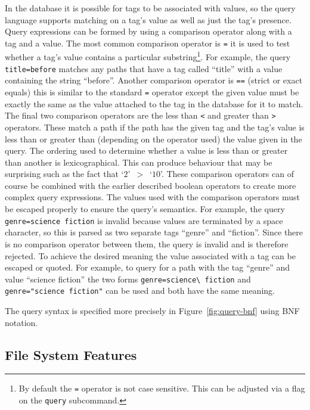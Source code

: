 In the database it is possible for tags to be associated with values, so the
query language supports matching on a tag's value as well as just the tag's
presence. Query expressions can be formed by using a comparison operator along
with a tag and a value. The most common comparison operator is \texttt{=} it is
used to test whether a tag's value contains a particular substring\footnote{By
default the \texttt{=} operator is not case sensitive. This can be adjusted via
a flag on the \texttt{query} subcommand.}. For example, the query
\texttt{title=before} matches any paths that have a tag called ``title'' with a
value containing the string ``before''. Another comparison operator is
\texttt{==} (strict or exact equals) this is similar to the standard \texttt{=}
operator except the given value must be exactly the same as the value attached
to the tag in the database for it to match. The final two comparison operators
are the less than \texttt{<} and greater than \texttt{>} operators. These match
a path if the path has the given tag and the tag's value is less than or
greater than (depending on the operator used) the value given in the query. The
ordering used to determine whether a value is less than or greater than another
is lexicographical. This can produce behaviour that may be surprising such as
the fact that `$2$'~$>$~`$10$'. These comparison operators can of course be
combined with the earlier described boolean operators to create more complex
query expressions. The values used with the comparison operators must be
escaped properly to ensure the query's semantics. For example, the query
\texttt{genre=science fiction} is invalid because values are terminated by a
space character, so this is parsed as two separate tags ``genre'' and
``fiction''. Since there is no comparison operator between them, the query is
invalid and is therefore rejected. To achieve the desired meaning the value
associated with a tag can be escaped or quoted. For example, to query for a
path with the tag ``genre'' and value ``science fiction'' the two forms
\verb_genre=science\ fiction_ and \texttt{genre="science fiction"} can be used
and both have the same meaning.

The query syntax is specified more precisely in Figure~\ref{fig:query-bnf}
using BNF notation.

\subsection{File System Features}
\label{sec:fs-features}

